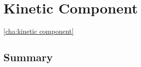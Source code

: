 \chapter{Kinetic Component}\ref{cha:kinetic component}


    
    
    
    


    \section*{Summary}
    